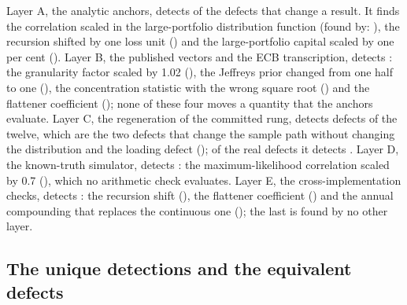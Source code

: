 Layer A, the analytic anchors, detects \ablAReal{} of the \ablReal{} defects that change a result. It finds the correlation scaled in the large-portfolio distribution function (found by: \ablDetTwo{}), the recursion shifted by one loss unit (\ablDetFive{}) and the large-portfolio capital scaled by one per cent (\ablDetEleven{}). Layer B, the published vectors and the ECB transcription, detects \ablBReal{}: the granularity factor scaled by 1.02 (\ablDetOne{}), the Jeffreys prior changed from one half to one (\ablDetSix{}), the concentration statistic with the wrong square root (\ablDetSeven{}) and the flattener coefficient (\ablDetEight{}); none of these four moves a quantity that the anchors evaluate. Layer C, the regeneration of the committed rung, detects \ablCAll{} defects of the twelve, which are the two defects that change the sample path without changing the distribution and the loading defect (\ablDetFour{}); of the real defects it detects \ablCReal{}. Layer D, the known-truth simulator, detects \ablDReal{}: the maximum-likelihood correlation scaled by 0.7 (\ablDetTen{}), which no arithmetic check evaluates. Layer E, the cross-implementation checks, detects \ablEReal{}: the recursion shift (\ablDetFive{}), the flattener coefficient (\ablDetEight{}) and the annual compounding that replaces the continuous one (\ablDetNine{}); the last is found by no other layer.

\subsection{The unique detections and the equivalent defects}

